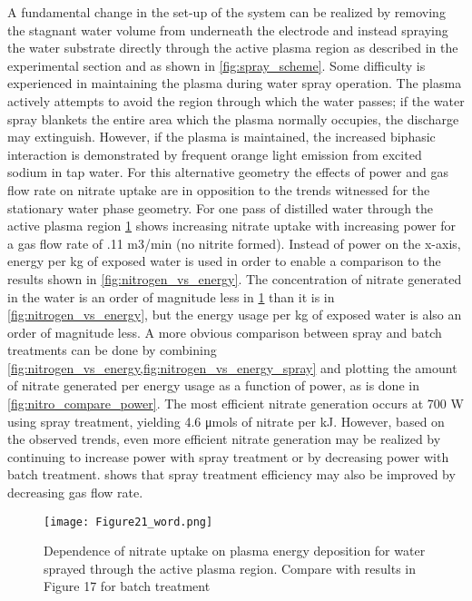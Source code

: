 A fundamental change in the set-up of the system can be realized by removing the stagnant water volume from underneath the electrode and instead spraying the water substrate directly through the active plasma region as described in the experimental section and as shown in \cref{fig:spray_scheme}.  Some difficulty is experienced in maintaining the plasma during water spray operation.  The plasma actively attempts to avoid the region through which the water passes; if the water spray blankets the entire area which the plasma normally occupies, the discharge may extinguish.  However, if the plasma is maintained, the increased biphasic interaction is demonstrated by frequent orange light emission from excited sodium in tap water.  For this alternative geometry the effects of power and gas flow rate on nitrate uptake are in opposition to the trends witnessed for the stationary water phase geometry.   For one pass of distilled water through the active plasma region \cref{fig:nitrogen_vs_energy_spray} shows increasing nitrate uptake with increasing power for a gas flow rate of .11 m3/min (no nitrite formed).  Instead of power on the x-axis, energy per kg of exposed water is used in order to enable a comparison to the results shown in \cref{fig:nitrogen_vs_energy}.  The concentration of nitrate generated in the water is an order of magnitude less in \cref{fig:nitrogen_vs_energy_spray} than it is in \cref{fig:nitrogen_vs_energy}, but the energy usage per kg of exposed water is also an order of magnitude less.  A more obvious comparison between spray and batch treatments can be done by combining \cref{fig:nitrogen_vs_energy,fig:nitrogen_vs_energy_spray} and plotting the amount of nitrate generated per energy usage as a function of power, as is done in \cref{fig:nitro_compare_power}.  The most efficient nitrate generation occurs at 700 W using spray treatment, yielding 4.6 μmols of nitrate per kJ.  However, based on the observed trends, even more efficient nitrate generation may be realized by continuing to increase power with spray treatment or by decreasing power with batch treatment.   shows that spray treatment efficiency may also be improved by decreasing gas flow rate.

\begin{figure}[htbp]
  \centering
  \texttt{[image: Figure21\_word.png]}
  \caption{Dependence of nitrate uptake on plasma energy deposition for water sprayed through the active plasma region.  Compare with results in Figure 17 for batch treatment}
  \label{fig:nitrogen_vs_energy_spray}
\end{figure}

